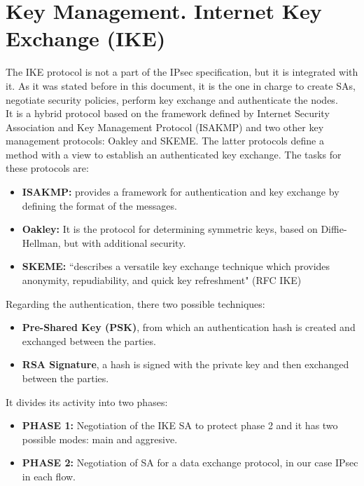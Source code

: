 \documentclass[11pt]{book}
\begin{document}
\section{Key Management. Internet Key Exchange (IKE)}
The IKE protocol is not a part of the IPsec specification, but it is integrated with it. As it was stated before in this document, it is the one in charge to create SAs, negotiate security policies, perform key exchange and authenticate the nodes.\\
It is a hybrid protocol based on the framework defined by Internet Security Association and Key Management Protocol (ISAKMP) and two other key management protocols: Oakley and SKEME. The latter protocols define a method with a view to establish an authenticated key exchange. The tasks for these protocols are:
\begin{itemize}
\item \textbf{ISAKMP:} provides a framework for authentication and key exchange by defining the format of the messages.
\item \textbf{Oakley:} It is the protocol for determining symmetric keys, based on Diffie-Hellman, but with additional security.
\item \textbf{SKEME:} ``describes a versatile key exchange technique which provides anonymity, repudiability, and quick key refreshment" (RFC IKE)
\end{itemize}
Regarding the authentication, there two possible techniques:
\begin{itemize}
\item \textbf{Pre-Shared Key (PSK)}, from which an authentication hash is created and exchanged between the parties.
\item \textbf{RSA Signature}, a hash is signed with the private key and then exchanged  between the parties. 
\end{itemize}
It divides its activity into two phases:
\begin{itemize}
\item \textbf{PHASE 1:} Negotiation of the IKE SA to protect phase 2 and it has two possible modes: main and aggresive.
\item \textbf{PHASE 2:} Negotiation of SA for a data exchange protocol, in our case IPsec in each flow.
\end{itemize}

\break
\end{document}
